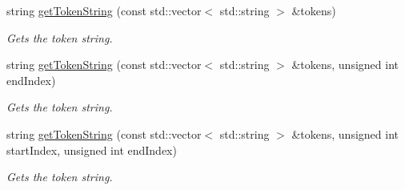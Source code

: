 \begin{DoxyCompactItemize}
string \hyperlink{class_simulator_a60c731cb40b4e6093cd1f73e35d70ee8}{get\+Token\+String} (const std\+::vector$<$ std\+::string $>$ \&tokens)
\begin{DoxyCompactList}\small\item\em Gets the token string. \end{DoxyCompactList}\item 
string \hyperlink{class_simulator_a5d211715eb26466cd5f67cdbef66c581}{get\+Token\+String} (const std\+::vector$<$ std\+::string $>$ \&tokens, unsigned int end\+Index)
\begin{DoxyCompactList}\small\item\em Gets the token string. \end{DoxyCompactList}\item 
string \hyperlink{class_simulator_ac3deed54edd4354e79f396a614a944de}{get\+Token\+String} (const std\+::vector$<$ std\+::string $>$ \&tokens, unsigned int start\+Index, unsigned int end\+Index)
\begin{DoxyCompactList}\small\item\em Gets the token string. \end{DoxyCompactList}\end{DoxyCompactItemize}
